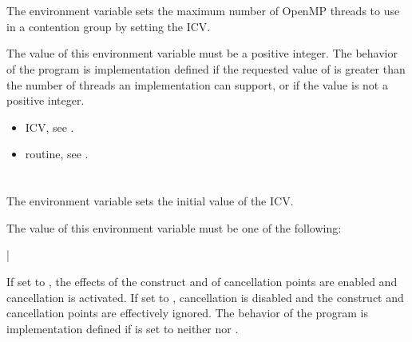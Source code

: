\section{}
\label{sec:OMP_THREAD_LIMIT}
The  environment variable sets the maximum number of OpenMP threads to use in a contention group by setting the  ICV.

The value of this environment variable must be a positive integer. The behavior of the
program is implementation defined if the requested value of  is
greater than the number of threads an implementation can support, or if the value is not
a positive integer.

\crossreferences
\begin{itemize}
\item {} ICV, see .

\item {} routine, see .
\end{itemize}









\section{}
\label{sec:OMP_CANCELLATION}
The  environment variable sets the initial value of the 
ICV.

The value of this environment variable must be one of the following:

{|}

If set to , the
effects of the  construct and of cancellation points are enabled and cancellation
is activated. If set to , cancellation is disabled and the  construct and
cancellation points are effectively ignored. The behavior of the program is
implementation defined if  is set to neither 
nor .

